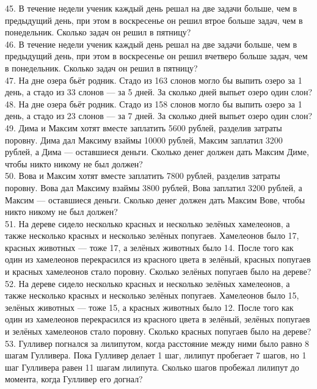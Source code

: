 45. В течение недели ученик каждый день решал на две задачи больше, чем в предыдущий день, при этом в воскресенье он решил втрое больше задач, чем в понедельник. Сколько задач он решил в пятницу?\\
46. В течение недели ученик каждый день решал на две задачи больше, чем в предыдущий день, при этом в воскресенье он решил вчетверо больше задач, чем в понедельник. Сколько задач он решил в пятницу?\\
47. На дне озера бьёт родник. Стадо из 163 слонов могло бы выпить озеро за 1 день, а стадо из 33 слонов --- за 5 дней. За сколько дней выпьет озеро один слон?\\
48. На дне озера бьёт родник. Стадо из 158 слонов могло бы выпить озеро за 1 день, а стадо из 23 слонов --- за 7 дней. За сколько дней выпьет озеро один слон?\\
49. Дима и Максим хотят вместе заплатить 5600 рублей, разделив затраты поровну. Дима дал Максиму взаймы 10000 рублей, Максим заплатил 3200 рублей, а Дима --- оставшиеся деньги. Сколько денег должен дать Максим Диме, чтобы никто никому не был должен?\\
50. Вова и Максим хотят вместе заплатить 7800 рублей, разделив затраты поровну. Вова дал Максиму взаймы 3800 рублей, Вова заплатил 3200 рублей, а Максим --- оставшиеся деньги. Сколько денег должен дать Максим Вове, чтобы никто никому не был должен?\\
51. На дереве сидело несколько красных и несколько зелёных хамелеонов, а также несколько красных и несколько зелёных попугаев. Хамелеонов было 17, красных животных --- тоже 17, а зелёных животных было 14. После того как один из хамелеонов перекрасился из красного цвета в зелёный, красных попугаев и красных хамелеонов стало поровну. Сколько зелёных попугаев было на дереве?\\
52. На дереве сидело несколько красных и несколько зелёных хамелеонов, а также несколько красных и несколько зелёных попугаев. Хамелеонов было 15, зелёных животных --- тоже 15, а красных животных было 12. После того как один из хамелеонов перекрасился из красного цвета в зелёный, зелёных попугаев и зелёных хамелеонов стало поровну. Сколько красных попугаев было на дереве?\\
53. Гулливер погнался за лилипутом, когда расстояние между ними было равно 8 шагам Гулливера. Пока Гулливер делает 1 шаг, лилипут пробегает 7 шагов, но 1 шаг Гулливера равен 11 шагам лилипута. Сколько шагов пробежал лилипут до момента, когда Гулливер его догнал?\\
